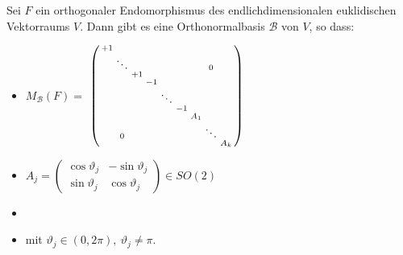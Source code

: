 \documentclass[8pt, a4paper, twocolumn, landscape]{article}
\newcommand{\comment}[1]{}
\begin{document}
\comment{
\begin{theorem}
Jeder unitäre Endomorphismus \(F\) eines endlich dimensionalen unitären Vektorraumes besitzt eine Orthonormalbasis aus Eigenvektoren von \(F .\) 
\end{theorem}

\begin{corollary}
Zu \(A \in U(n)\) gibt es ein \(S \in U(n)\) mit
$$
 S^\dagger \cdot A \cdot S = \left(\begin{array}{ccc}\lambda_{1} & & 0 \\ & \ddots & \\ 0 & & \lambda_{n}\end{array}\right)
 $$
wobei $\lambda_{i} \in \mathbb{C}$ mit $|\lambda_{i}|=1$ f"ur $i=1, ..., n $.
\end{corollary}
}

\begin{theorem}
Sei $F$ ein orthogonaler Endomorphismus des endlichdimensionalen euklidischen Vektorraums $V$. Dann gibt es eine Orthonormalbasis $\mathcal{B}$ von $V$, so dass:
\vspace{-20pt}
\begin{multicols}{2}
\begin{itemize}
\item[] $M_\mathcal{B}(F) =$
$
\begin{psmallmatrix}
{+1} & {} & {} & {} & {} & {} & {} & {} & {} 
\\ {} & {\ddots} & {} & {} & {} & {} & {} & {0} & {} 
\\ {} & {} & {+1} & {} & {} & {} & {} & {} & {} 
\\ {} & {} & {} & {-1} & {} & {} & {} & {} & {} 
\\ {} & {} & {} & {} & {}\ddots & {} & {} & {} & {} 
\\ {} & {} & {} & {} & {} & {-1} & {} & {} & {} 
\\ {} & {} & {} & {} & {} & {} & {A_1} & {} & {} 
\\ {} & {0} & {} & {} & {} & {} & {} & {\ddots} & {} 
\\ {} & {} & {} & {} & {} & {} & {} & {} & {A_k} 
\end{psmallmatrix}\\
$
\item[] $A_{j}=\left(\begin{array}{cc}\cos \vartheta_{j} & -\sin \vartheta_{j} \\ \sin \vartheta_{j} & \cos \vartheta_{j}\end{array}\right) \in SO(2)$ 
\item[] \ \\
\item[] mit $\vartheta_j \in (0, 2\pi), \ \vartheta_j \neq \pi$.
\end{itemize}
\end{multicols}
\end{theorem}
\end{document}
